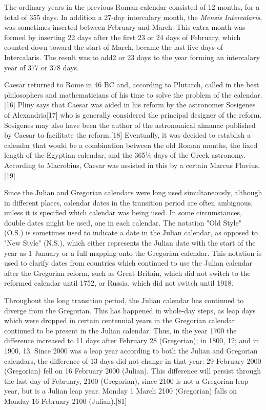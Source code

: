 The ordinary years in the previous Roman calendar consisted of 12 months, for a total of 355 days. In addition a 27-day intercalary month, the \textit{Mensis Intercalaris}, was sometimes inserted between February and March. This extra month was formed by inserting 22 days after the first 23 or 24 days of February, which counted down toward the start of March, 
became the last five days of Intercalaris. The result was to add2 or 23 days to the year forming an intercalary year of 377 or 
378 days.

Caesar returned to Rome in 46 BC and, according to Plutarch, called in the best philosophers and mathematicians of his time to solve the problem of the calendar.[16] Pliny says that Caesar was aided in his reform by the astronomer Sosigenes of Alexandria[17] who is generally considered the principal designer of the reform. Sosigenes may also have been the author of the astronomical almanac published by Caesar to facilitate the reform.[18] Eventually, it was decided to establish a calendar that would be a combination between the old Roman months, the fixed length of the Egyptian calendar, and the 365¼ days of the Greek astronomy. According to Macrobius, Caesar was assisted in this by a certain Marcus Flavius.[19]

Since the Julian and Gregorian calendars were long used simultaneously, although in different places, calendar dates in the transition period are often ambiguous, unless it is specified which calendar was being used. In some circumstances, double dates might be used, one in each calendar. The notation "Old Style" (O.S.) is sometimes used to indicate a date in the Julian calendar, as opposed to "New Style" (N.S.), which either represents the Julian date with the start of the year as 1 January or a full mapping onto the Gregorian calendar. This notation is used to clarify dates from countries which continued to use the Julian calendar after the Gregorian reform, such as Great Britain, which did not switch to the reformed calendar until 1752, or Russia, which did not switch until 1918.

Throughout the long transition period, the Julian calendar has continued to diverge from the Gregorian. This has happened in whole-day steps, as leap days which were dropped in certain centennial years in the Gregorian calendar continued to be present in the Julian calendar. Thus, in the year 1700 the difference increased to 11 days after February 28 (Gregorian); in 1800, 12; and in 1900, 13. Since 2000 was a leap year according to both the Julian and Gregorian calendars, the difference of 13 days did not change in that year: 29 February 2000 (Gregorian) fell on 16 February 2000 (Julian). This difference will persist through the last day of February, 2100 (Gregorian), since 2100 is not a Gregorian leap year, but is a Julian leap year. Monday 1 March 2100 (Gregorian) falls on Monday 16 February 2100 (Julian).[81]


